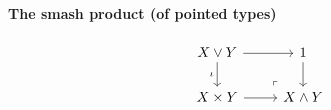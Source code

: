 \documentclass[10pt,oneside,leqno,openright]{memoir}
\begin{document}
\paragraph{The smash product (of pointed types)}
\[\begin{tikzcd}[ampersand replacement=\&]
	{X\vee Y} \& 1 \\
	{X \times Y} \& {X \wedge Y}
	\arrow[from=1-1, to=1-2]
	\arrow["\iota"', from=1-1, to=2-1]
	\arrow[from=1-2, to=2-2]
	\arrow[from=2-1, to=2-2]
	\arrow["\lrcorner"{anchor=center, pos=0.125, rotate=180}, draw=none, from=2-2, to=1-1]
\end{tikzcd}\]
%

%




\end{document}
